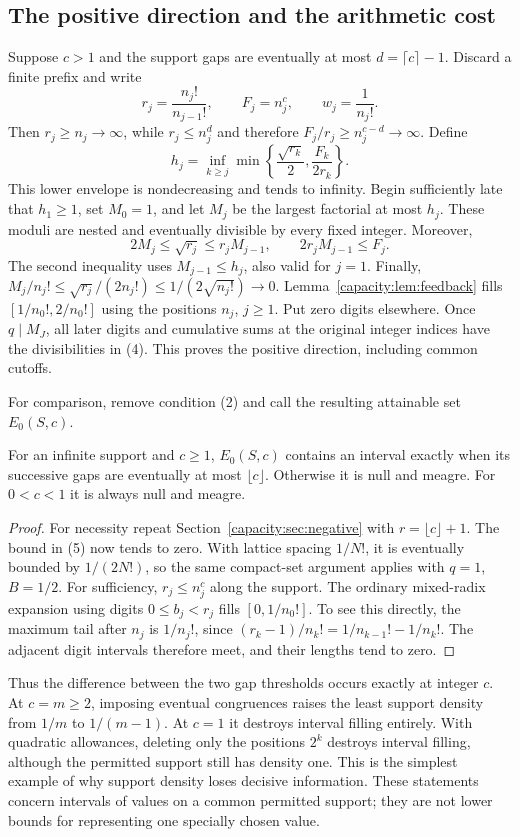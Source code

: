 \documentclass[11pt]{article}
\begin{document}
\subsection{The positive direction and the arithmetic cost}
Suppose $c>1$ and the support gaps are eventually at most
$d=\lceil c\rceil-1$. Discard a finite prefix and write
\[
 r_j=\frac{n_j!}{n_{j-1}!},\qquad F_j=n_j^c,\qquad w_j=\frac1{n_j!}.
\]
Then $r_j\ge n_j\to\infty$, while $r_j\le n_j^d$ and therefore
$F_j/r_j\ge n_j^{c-d}\to\infty$. Define
\[
 h_j=\inf_{k\ge j}\min\left\{\frac{\sqrt{r_k}}2,
                                  \frac{F_k}{2r_k}\right\}.
\]
This lower envelope is nondecreasing and tends to infinity. Begin sufficiently
late that $h_1\ge1$, set $M_0=1$, and let $M_j$ be the largest factorial at
most $h_j$. These moduli are nested and eventually divisible by every fixed
integer. Moreover,
\[
 2M_j\le\sqrt{r_j}\le r_jM_{j-1},\qquad
 2r_jM_{j-1}\le F_j.
\]
The second inequality uses $M_{j-1}\le h_j$, also valid for $j=1$.
Finally,
$M_j/n_j!\le\sqrt{r_j}/(2n_j!)\le1/(2\sqrt{n_j!})\to0$.
Lemma~\ref{capacity:lem:feedback} fills $[1/n_0!,2/n_0!]$ using the positions $n_j$,
$j\ge1$. Put zero digits elsewhere. Once $q\mid M_J$, all later digits and
cumulative sums at the original integer indices have the divisibilities in
(4). This proves the positive direction, including common cutoffs.

For comparison, remove condition (2) and call the resulting attainable set
$E_0(S,c)$.
\begin{proposition}\label{capacity:prop:unrestricted}
For an infinite support and $c\ge1$, $E_0(S,c)$ contains an interval exactly
when its successive gaps are eventually at most $\lfloor c\rfloor$.
Otherwise it is null and meagre. For $0<c<1$ it is always null and meagre.
\end{proposition}
\begin{proof}
For necessity repeat Section~\ref{capacity:sec:negative} with
$r=\lfloor c\rfloor+1$. The bound in (5) now tends to zero. With lattice
spacing $1/N!$, it is eventually bounded by $1/(2N!)$, so the same compact-set
argument applies with $q=1$, $B=1/2$.
For sufficiency, $r_j\le n_j^c$ along the support. The ordinary mixed-radix
expansion using digits $0\le b_j<r_j$ fills $[0,1/n_0!]$. To see this
directly, the maximum tail after $n_j$ is $1/n_j!$, since
$(r_k-1)/n_k!=1/n_{k-1}!-1/n_k!$. The adjacent digit intervals therefore
meet, and their lengths tend to zero.
\end{proof}
Thus the difference between the two gap thresholds occurs exactly at integer
$c$. At $c=m\ge2$, imposing eventual congruences raises the least support
density from $1/m$ to $1/(m-1)$. At $c=1$ it destroys interval filling entirely.
With quadratic allowances, deleting only the positions $2^k$ destroys
interval filling, although the permitted support still has density one.
This is the simplest example of why support density loses decisive information.
These statements concern intervals of values on a common permitted support;
they are not lower bounds for representing one specially chosen value.
\end{document}
